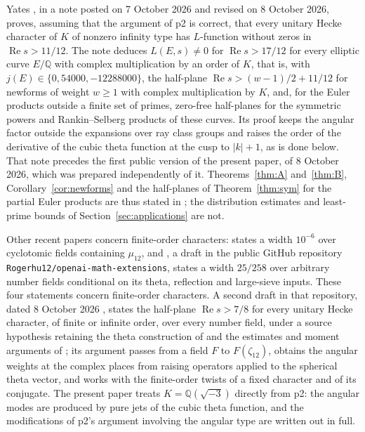 \documentclass[11pt,a4paper]{article}
\numberwithin{equation}{section}
\theoremstyle{definition}
\theoremstyle{remark}
\newcommand{\Q}{\mathbb Q}
\newcommand{\Rea}{\operatorname{Re}}
\begin{document}
Yates \cite{Yates}, in a note posted on 7 October 2026 and revised on 8 October 2026, proves, assuming that the argument of p2 is correct, that every unitary Hecke character of $K$ of nonzero infinity type has $L$-function without zeros in $\Rea s>11/12$. The note deduces $L(E,s)\ne0$ for $\Rea s>17/12$ for every elliptic curve $E/\Q$ with complex multiplication by an order of $K$, that is, with $j(E)\in\{0,54000,-12288000\}$, the half-plane $\Rea s>(w-1)/2+11/12$ for newforms of weight $w\ge1$ with complex multiplication by $K$, and, for the Euler products outside a finite set of primes, zero-free half-planes for the symmetric powers and Rankin--Selberg products of these curves. Its proof keeps the angular factor outside the expansions over ray class groups and raises the order of the derivative of the cubic theta function at the cusp to $|k|+1$, as is done below. That note precedes the first public version of the present paper, of 8 October 2026, which was prepared independently of it. Theorems~\ref{thm:A} and~\ref{thm:B}, Corollary~\ref{cor:newforms} and the half-planes of Theorem~\ref{thm:sym} for the partial Euler products are thus stated in \cite{Yates}; the distribution estimates and least-prime bounds of Section~\ref{sec:applications} are not.

Other recent papers concern finite-order characters: \cite[Theorem 1.2]{PrimitiveRoots} states a width $10^{-6}$ over cyclotomic fields containing $\mu_{12}$, and \cite{Followup}, a draft in the public GitHub repository \nolinkurl{Rogerhu12/openai-math-extensions}, states a width $25/258$ over arbitrary number fields conditional on its theta, reflection and large-sieve inputs. These four statements concern finite-order characters. A second draft in that repository, dated 8 October 2026 \cite{FollowupSevenEighths}, states the half-plane $\Rea s>7/8$ for every unitary Hecke character, of finite or infinite order, over every number field, under a source hypothesis retaining the theta construction of \cite{PrimitiveRoots} and the estimates and moment arguments of \cite{QRH78}; its argument passes from a field $F$ to $F(\zeta_{12})$, obtains the angular weights at the complex places from raising operators applied to the spherical theta vector, and works with the finite-order twists of a fixed character and of its conjugate. The present paper treats $K=\Q(\sqrt{-3})$ directly from p2: the angular modes are produced by pure jets of the cubic theta function, and the modifications of p2's argument involving the angular type are written out in full.
\end{document}
